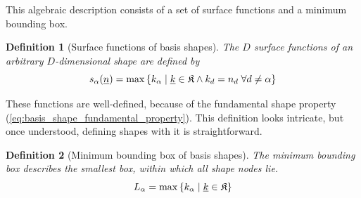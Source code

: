 \documentclass{article}
\newtheorem{definition}{Definition}
\begin{document}
This algebraic description consists of a set of surface functions and
a minimum bounding box.

\begin{definition}[Surface functions of basis shapes]
  The \(D\) surface functions of an arbitrary \(D\)-dimensional shape are defined by
  \begin{equation}
  s_{\alpha}(\underline{n})=\max
    \left\{k_{\alpha} \mid \underline{k} \in \mathfrak{K} \land
      k_d = n_d \; \forall d \neq \alpha
    \right\}
    \label{eq:basis_shape_surface_function}
  \end{equation}
\end{definition}

These functions are well-defined, because of the fundamental shape property
(\ref{eq:basis_shape_fundamental_property}).
This definition looks intricate, but once understood, defining shapes with it
is straightforward.

\begin{definition}[Minimum bounding box of basis shapes]
  The minimum bounding box describes the smallest
  box, within which all shape nodes lie.
  \begin{equation}
    L_{\alpha}=\max\left\{k_{\alpha} \mid \underline{k} \in \mathfrak{K}\right\}
    \label{eq:basis_shape_bbox}
  \end{equation}
\end{definition}
\end{document}
